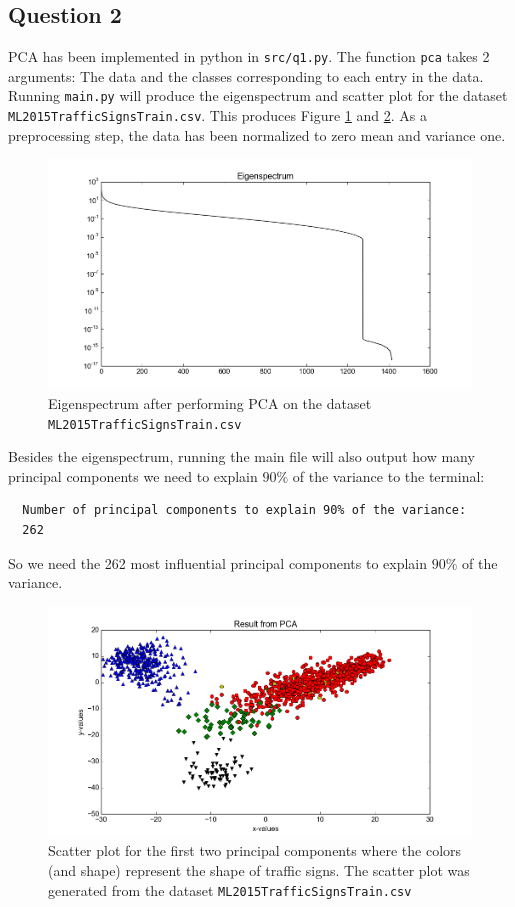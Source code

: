 \documentclass[a4paper]{article}
\begin{document}
\subsection{Question 2}
PCA has been implemented in python in \texttt{src/q1.py}. The function \texttt{pca} takes 2 arguments: The data and the classes corresponding to each entry in the data. Running \texttt{main.py} will produce the eigenspectrum and scatter plot for the dataset \texttt{ML2015TrafficSignsTrain.csv}. This produces Figure \ref{fig2} and \ref{fig3}. As a preprocessing step, the data has been normalized to zero mean and variance one.
\begin{figure}[H]
  \centering
  \captionsetup{justification=centering,margin=2cm}
  \includegraphics[scale=0.6]{eigenspectrum1}
  \caption{Eigenspectrum after performing PCA on the dataset \texttt{ML2015TrafficSignsTrain.csv}}
  \label{fig2}
\end{figure}
Besides the eigenspectrum, running the main file will also output how many principal components we need to explain $90\%$ of the variance to the terminal:
\begin{verbatim}
  Number of principal components to explain 90% of the variance:
  262
\end{verbatim}
So we need the 262 most influential principal components to explain $90\%$ of the variance.
\begin{figure}[H]
  \centering
  \captionsetup{justification=centering,margin=2cm}
  \includegraphics[scale=0.6]{scatter1}
  \caption{Scatter plot for the first two principal components where the colors (and shape) represent the shape of traffic signs. The scatter plot was generated from the dataset \texttt{ML2015TrafficSignsTrain.csv}}
  \label{fig3}
\end{figure}
\end{document}
